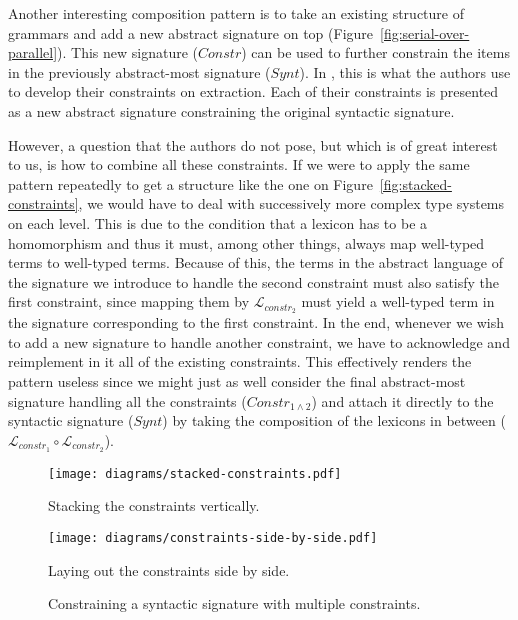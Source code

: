 Another interesting composition pattern is to take an existing structure
of grammars and add a new abstract signature on top
(Figure~\ref{fig:serial-over-parallel}). This new signature ($Constr$)
can be used to further constrain the items in the previously
abstract-most signature ($Synt$). In \cite{pogodalla2012controlling},
this is what the authors use to develop their constraints on
extraction. Each of their constraints is presented as a new abstract
signature constraining the original syntactic signature.

However, a question that the authors do not pose, but which is of great
interest to us, is how to combine all these constraints. If we were to
apply the same pattern repeatedly to get a structure like the one on
Figure~\ref{fig:stacked-constraints}, we would have to deal with
successively more complex type systems on each level. This is due to the
condition that a lexicon has to be a homomorphism and thus it must,
among other things, always map well-typed terms to well-typed
terms. Because of this, the terms in the abstract language of the
signature we introduce to handle the second constraint must also satisfy
the first constraint, since mapping them by $\mathcal{L}_{constr_2}$
must yield a well-typed term in the signature corresponding to the first
constraint. In the end, whenever we wish to add a new signature to
handle another constraint, we have to acknowledge and reimplement in it
all of the existing constraints. This effectively renders the pattern
useless since we might just as well consider the final abstract-most
signature handling all the constraints ($Constr_{1 \land 2}$) and attach
it directly to the syntactic signature ($Synt$) by taking the
composition of the lexicons in between ($\mathcal{L}_{constr_1} \circ
\mathcal{L}_{constr_2}$).

\begin{figure}[t]
  \centering
  \begin{minipage}[b]{0.4\textwidth}
    \centering
    \texttt{[image: diagrams/stacked-constraints.pdf]}
    \caption{\label{fig:stacked-constraints} Stacking the constraints
      vertically.}
  \end{minipage}
  \qquad
  \begin{minipage}[b]{0.4\textwidth}
    \centering
    \texttt{[image: diagrams/constraints-side-by-side.pdf]}
    \caption{\label{fig:constraints-side-by-side} Laying out the
      constraints side by side.}
  \end{minipage}
  \caption{Constraining a syntactic signature with multiple
    constraints.}
\end{figure}

